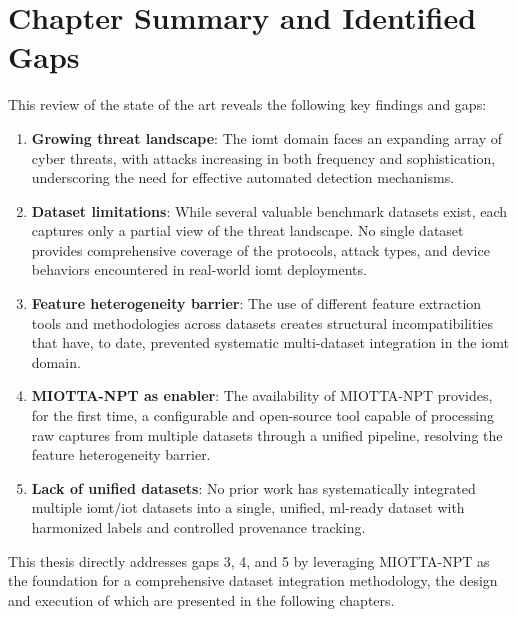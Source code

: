 \section{Chapter Summary and Identified Gaps}
\label{sec:gaps}

This review of the state of the art reveals the following key findings and gaps:

\begin{enumerate}
    \item \textbf{Growing threat landscape}: The \gls{iomt} domain faces an expanding array of cyber threats, with attacks increasing in both frequency and sophistication, underscoring the need for effective automated detection mechanisms.

    \item \textbf{Dataset limitations}: While several valuable benchmark datasets exist, each captures only a partial view of the threat landscape. No single dataset provides comprehensive coverage of the protocols, attack types, and device behaviors encountered in real-world \gls{iomt} deployments.

    \item \textbf{Feature heterogeneity barrier}: The use of different feature extraction tools and methodologies across datasets creates structural incompatibilities that have, to date, prevented systematic multi-dataset integration in the \gls{iomt} domain.

    \item \textbf{MIOTTA-NPT as enabler}: The availability of MIOTTA-NPT provides, for the first time, a configurable and open-source tool capable of processing raw captures from multiple datasets through a unified pipeline, resolving the feature heterogeneity barrier.

    \item \textbf{Lack of unified datasets}: No prior work has systematically integrated multiple \gls{iomt}/\gls{iot} datasets into a single, unified, \gls{ml}-ready dataset with harmonized labels and controlled provenance tracking.
\end{enumerate}

This thesis directly addresses gaps 3, 4, and 5 by leveraging MIOTTA-NPT as the foundation for a comprehensive dataset integration methodology, the design and execution of which are presented in the following chapters.
